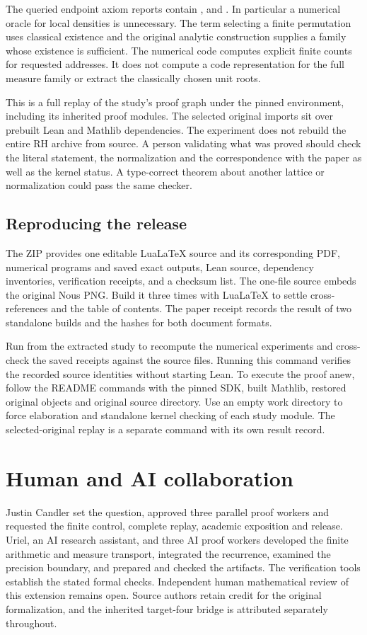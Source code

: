 \documentclass[12pt,letterpaper]{article}
\newcommand{\code}[1]{\texttt{\detokenize{#1}}}
\begin{document}
The queried endpoint axiom reports contain \code{propext}, \code{Classical.choice} and \code{Quot.sound}. In particular a numerical oracle for local densities is unnecessary. The term selecting a finite permutation uses classical existence and the original analytic construction supplies a family whose existence is sufficient. The numerical code computes explicit finite counts for requested addresses. It does not compute a code representation for the full measure family or extract the classically chosen unit roots.

This is a full replay of the study's proof graph under the pinned environment, including its inherited proof modules. The selected original imports sit over prebuilt Lean and Mathlib dependencies. The experiment does not rebuild the entire RH archive from source. A person validating what was proved should check the literal statement, the normalization and the correspondence with the paper as well as the kernel status. A type-correct theorem about another lattice or normalization could pass the same checker.

\subsection{Reproducing the release}
The ZIP provides one editable LuaLaTeX source and its corresponding PDF, numerical programs and saved exact outputs, Lean source, dependency inventories, verification receipts, and a checksum list. The one-file source embeds the original Nous PNG. Build it three times with LuaLaTeX to settle cross-references and the table of contents. The paper receipt records the result of two standalone builds and the hashes for both document formats.

Run \code{python3 -B verify.py} from the extracted study to recompute the numerical experiments and cross-check the saved receipts against the source files. Running this command verifies the recorded source identities without starting Lean. To execute the proof anew, follow the README commands with the pinned SDK, built Mathlib, restored original objects and original source directory. Use an empty work directory to force elaboration and standalone kernel checking of each study module. The selected-original replay is a separate command with its own result record.

\section*{Human and AI collaboration}
Justin Candler set the question, approved three parallel proof workers and requested the finite control, complete replay, academic exposition and release. Uriel, an AI research assistant, and three AI proof workers developed the finite arithmetic and measure transport, integrated the recurrence, examined the precision boundary, and prepared and checked the artifacts. The verification tools establish the stated formal checks. Independent human mathematical review of this extension remains open. Source authors retain credit for the original formalization, and the inherited target-four bridge is attributed separately throughout.
\end{document}
